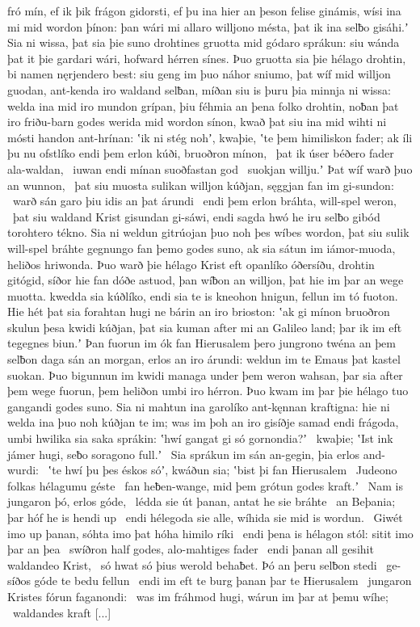 fró mín, ef ik þik frágon gidorsti, ef þu ina hier an þeson felise ginámis,
wísi ina mi mid wordon þínon: þan wári mi allaro willjono mésta,
þat ik ina selƀo gisáhi.ʼ Sia ni wissa, þat sia þie suno drohtines
gruotta mid gódaro sprákun: siu wánda þat it þie gardari wári,
hofward hérren sínes. Þuo gruotta sia þie hélago drohtin,
bi namen nęrjendero best: siu geng im þuo náhor sniumo,
þat wíf mid willjon guodan, ant-kenda iro waldand selƀan,
míðan siu is þuru þia minnja ni wissa: welda ina mid iro mundon grípan,
þiu féhmia an þena folko drohtin, noƀan þat iro friðu-barn godes
werida mid wordon sínon, kwað þat siu ina mid wihti ni mósti
handon ant-hrínan: ʽik ni stég nohʼ, kwaþie, ʽte þem himiliskon fader;
ak íli þu nu ofstlíko endi þem erlon kúði,
bruoðron mínon, \hld\ þat ik úser béðero fader
ala-waldan, \hld\ iuwan endi mínan
suoðfastan god \hld\ suokjan willju.ʼ
Þat wíf warð þuo an wunnon, \hld\ þat siu muosta sulikan willjon kúðjan,
sęggjan fan im gi-sundon: \hld\ warð sán garo
þiu idis an þat árundi \hld\ endi þem erlon bráhta,
will-spel weron, \hld\ þat siu waldand Krist
gisundan gi-sáwi, endi sagda hwó he iru selƀo gibód
torohtero tékno. Sia ni weldun gitrúojan þuo noh
þes wíbes wordon, þat siu sulik will-spel bráhte
gegnungo fan þemo godes suno, ak sia sátun im iámor-muoda,
heliðos hriwonda. Þuo warð þie hélago Krist
eft opanlíko óðersíðu,
drohtin gitógid, síðor hie fan dóðe astuod,
þan wíƀon an willjon, þat hie im þar an wege muotta.
kwedda sia kúðlíko, endi sia te is kneohon hnigun,
fellun im tó fuoton. Hie hét þat sia forahtan hugi
ne bárin an iro brioston: ʽak gi mínon bruoðron skulun
þesa kwidi kúðjan, þat sia kuman after mi
an Galileo land; þar ik im eft tegegnes biun.ʼ
Þan fuorun im ók fan Hierusalem þero jungrono twéna
an þem selƀon daga sán an morgan,
erlos an iro árundi: weldun im te Emaus
þat kastel suokan. Þuo bigunnun im kwidi managa
under þem weron wahsan, þar sia after þem wege fuorun,
þem heliðon umbi iro hérron. Þuo kwam im þar þie hélago tuo
gangandi godes suno. Sia ni mahtun ina garolíko
ant-kęnnan kraftigna: hie ni welda ina þuo noh kúðjan te im;
was im þoh an iro gisíðje samad endi frágoda, umbi hwilika sia saka sprákin:
ʽhwí gangat gi só gornondia?ʼ \hld\ kwaþie; ʽIst ink jámer hugi,
seƀo soragono full.ʼ \hld\ Sia sprákun im sán an-gegin,
þia erlos and-wurdi: \hld\ ʽte hwí þu þes éskos sóʼ, kwáðun sia;
ʽbist þi fan Hierusalem \hld\ Judeono folkas
hélagumu géste \hld\ fan heƀen-wange,
mid þem grótun godes kraft.ʼ \hld\ Nam is jungaron þó,
erlos góde, \hld\ lédda sie út þanan,
antat he sie bráhte \hld\ an Beþania;
þar hóf he is hendi up \hld\ endi hélegoda sie alle,
wíhida sie mid is wordun. \hld\ Giwét imo up þanan,
sóhta imo þat hóha himilo ríki \hld\ endi þena is hélagon stól:
sitit imo þar an þea \hld\ swíðron half godes,
alo-mahtiges fader \hld\ endi þanan all gesihit
waldandeo Krist, \hld\ só hwat só þius werold behaƀet.
Þó an þeru selƀon stedi \hld\ ge-síðos góde
te bedu fellun \hld\ endi im eft te burg þanan
þar te Hierusalem \hld\ jungaron Kristes
fórun faganondi: \hld\ was im fráhmod hugi,
wárun im þar at þemu wíhe; \hld\ waldandes kraft
[...]
